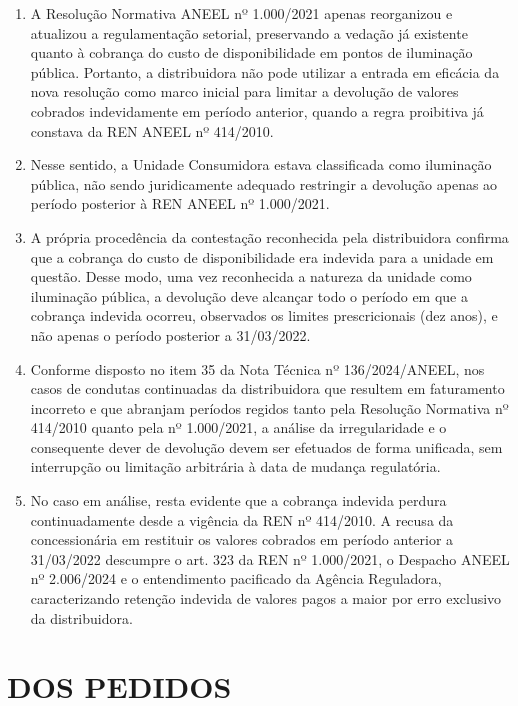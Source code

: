 \begin{enumerate}[resume]
    \item A Resolução Normativa ANEEL nº 1.000/2021 apenas reorganizou e atualizou a regulamentação setorial, preservando a vedação já existente quanto à cobrança do custo de disponibilidade em pontos de iluminação pública. Portanto, a distribuidora não pode utilizar a entrada em eficácia da nova resolução como marco inicial para limitar a devolução de valores cobrados indevidamente em período anterior, quando a regra proibitiva já constava da REN ANEEL nº 414/2010.

    \item Nesse sentido, a Unidade Consumidora \unidadeConsumidora{} estava classificada como iluminação pública, não sendo juridicamente adequado restringir a devolução apenas ao período posterior à REN ANEEL nº 1.000/2021.

    \item A própria procedência da contestação reconhecida pela distribuidora confirma que a cobrança do custo de disponibilidade era indevida para a unidade em questão. Desse modo, uma vez reconhecida a natureza da unidade como iluminação pública, a devolução deve alcançar todo o período em que a cobrança indevida ocorreu, observados os limites prescricionais (dez anos), e não apenas o período posterior a 31/03/2022.

    \item Conforme disposto no item 35 da Nota Técnica nº 136/2024/ANEEL, nos casos de condutas continuadas da distribuidora que resultem em faturamento incorreto e que abranjam períodos regidos tanto pela Resolução Normativa nº 414/2010 quanto pela nº 1.000/2021, a análise da irregularidade e o consequente dever de devolução devem ser efetuados de forma unificada, sem interrupção ou limitação arbitrária à data de mudança regulatória.

    \item No caso em análise, resta evidente que a cobrança indevida perdura continuadamente desde a vigência da REN nº 414/2010. A recusa da concessionária em restituir os valores cobrados em período anterior a 31/03/2022 descumpre o art. 323 da REN nº 1.000/2021, o Despacho ANEEL nº 2.006/2024 e o entendimento pacificado da Agência Reguladora, caracterizando retenção indevida de valores pagos a maior por erro exclusivo da distribuidora.
\end{enumerate}

\section{DOS PEDIDOS}

